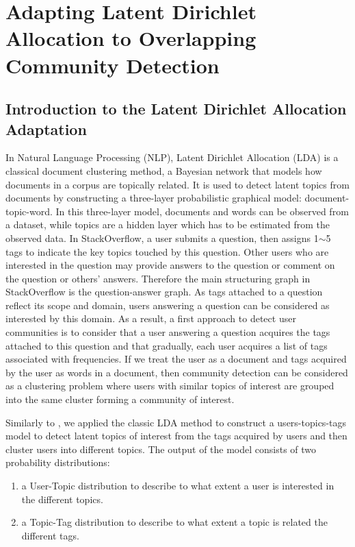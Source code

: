 \chapter{Adapting Latent Dirichlet Allocation to Overlapping Community Detection}
\doublespacing
\label{chap:lda}
\minitoc

\section{Introduction to the Latent Dirichlet Allocation Adaptation}
In Natural Language Processing (NLP), Latent Dirichlet Allocation (LDA) \cite{blei2003latent} is a classical document clustering method, a Bayesian network that models how documents in a corpus are topically related.
It is used to detect latent topics from documents by constructing a three-layer probabilistic graphical model: document-topic-word. In this three-layer model, documents and words can be observed from a dataset, while topics are a hidden layer which has to be estimated from the observed data.  
In StackOverflow, a user submits a question, then assigns 1$\sim$5 tags to indicate the key topics touched by this question. Other users who are interested in the question may provide answers to the question or comment on the question or others' answers. Therefore the main structuring graph in StackOverflow is the question-answer graph. As tags attached to a question  reflect its scope and domain, users answering a question can be considered as interested by this domain. As a result, a first approach to detect user communities is to consider that a user answering a question acquires the tags attached to this question and that gradually, each user acquires a list of tags associated with frequencies. If we treat the user as a document and tags acquired by the user as words in a document, then community detection can be considered as a clustering problem where users with similar topics of interest are grouped into the same cluster forming a community of interest.


Similarly to \cite{Li:2010:CTM:1871437.1871673}, we applied the classic LDA method to construct a users-topics-tags model to detect latent topics of interest from the tags acquired by users and then cluster users into different topics. The output of the model consists of two probability distributions:
\begin{enumerate}
 \item a User-Topic distribution to describe to what extent a user is interested in the different topics.
 \item a Topic-Tag distribution to describe to what extent a topic is related the different tags.
\end{enumerate}



